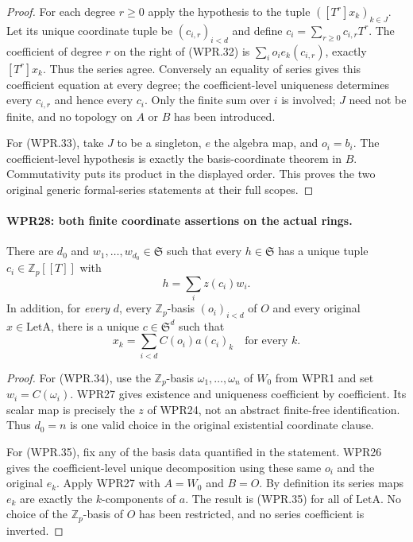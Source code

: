 \begin{proof}
For each degree $r\geq0$ apply the hypothesis to the tuple
$([T^r]x_k)_{k\in J}$. Let its unique coordinate tuple be
$(c_{i,r})_{i<d}$ and define $c_i=\sum_{r\geq0}c_{i,r}T^r$.
The coefficient of degree $r$ on the right of (WPR.32) is
$\sum_i o_i e_k(c_{i,r})$, exactly $[T^r]x_k$. Thus the
series agree. Conversely an equality of series gives this
coefficient equation at every degree; the coefficient-level
uniqueness determines every $c_{i,r}$ and hence every $c_i$.
Only the finite sum over $i$ is involved; $J$ need not be
finite, and no topology on $A$ or $B$ has been introduced.

For (WPR.33), take $J$ to be a singleton, $e$ the algebra map,
and $o_i=b_i$. The coefficient-level hypothesis is exactly
the basis-coordinate theorem in $B$. Commutativity puts its
product in the displayed order. This proves the two original
generic formal-series statements at their full scopes.
\end{proof}

\paragraph{WPR28: both finite coordinate assertions on the actual rings.}
\label{claim:WPR28}
There are $d_0$ and $w_1,\ldots,w_{d_0}\in\mathfrak S$ such
that every $h\in\mathfrak S$ has a unique tuple
$c_i\in\mathbb Z_p[[T]]$ with
\[
                         h=\sum_i z(c_i)w_i.                \tag{WPR.34}
\]
In addition, for \emph{every} $d$, every $\mathbb Z_p$-basis
$(o_i)_{i<d}$ of $O$ and every original $x\in\mathrm{LetA}$,
there is a unique $c\in\mathfrak S^d$ such that
\[
                         x_k=\sum_{i<d}C(o_i)a(c_i)_k
                         \quad\text{for every }k.           \tag{WPR.35}
\]

\begin{proof}
For (WPR.34), use the $\mathbb Z_p$-basis
$\omega_1,\ldots,\omega_n$ of $W_0$ from WPR1 and set
$w_i=C(\omega_i)$. WPR27 gives existence and uniqueness
coefficient by coefficient. Its scalar map is precisely the
$z$ of WPR24, not an abstract finite-free identification.
Thus $d_0=n$ is one valid choice in the original existential
coordinate clause.

For (WPR.35), fix any of the basis data quantified in the
statement. WPR26 gives the coefficient-level unique
decomposition using these same $o_i$ and the original $e_k$.
Apply WPR27 with $A=W_0$ and $B=O$. By definition its series
maps $e_k$ are exactly the $k$-components of $a$. The result
is (WPR.35) for all of $\mathrm{LetA}$. No choice of the
$\mathbb Z_p$-basis of $O$ has been restricted, and no series
coefficient is inverted.
\end{proof}

